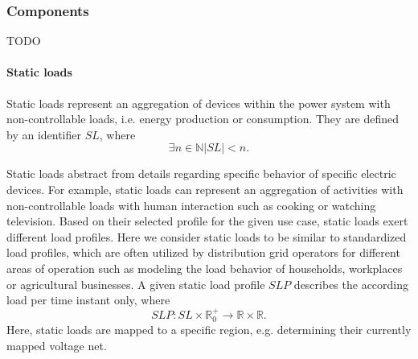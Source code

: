 \subsubsection{Components}
\label{components}

TODO

\paragraph{Static loads}
\label{static_loads}

Static loads represent an aggregation of devices within the power system with non-controllable loads, i.e. energy production or consumption. They are defined by an identifier $SL$, where 
\[
\exists n \in \mathbb{N} |SL| < n \mathrm{.}
\]

Static loads abstract from details regarding specific behavior of specific electric devices. For example, static loads can represent an aggregation of activities with non-controllable loads with human interaction such as cooking or watching television. Based on their selected profile for the given use case, static loads exert different load profiles. Here we consider static loads to be similar to standardized load profiles, which are often utilized by distribution grid operators for different areas of operation such as modeling the load behavior of households, workplaces or agricultural businesses. A given static load profile $SLP$ describes the according load per time instant only, where
\[
SLP : SL \times \mathbb{R}_0^+ \rightarrow \mathbb{R} \times \mathbb{R} \mathrm{.}
\]
Here, static loads are mapped to a specific region, e.g. determining their currently mapped voltage net.

%
%
%
%	
%


